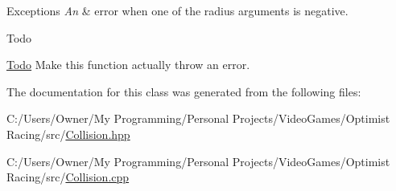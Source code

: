 \begin{DoxyExceptions}{Exceptions}
{\em An} & error when one of the radius arguments is negative. \\
\hline
\end{DoxyExceptions}
\begin{DoxyRefDesc}{Todo}
\item[\hyperlink{todo__todo000002}{Todo}]Make this function actually throw an error. \end{DoxyRefDesc}


The documentation for this class was generated from the following files\-:\begin{DoxyCompactItemize}
\item 
C\-:/\-Users/\-Owner/\-My Programming/\-Personal Projects/\-Video\-Games/\-Optimist Racing/src/\hyperlink{_collision_8hpp}{Collision.\-hpp}\item 
C\-:/\-Users/\-Owner/\-My Programming/\-Personal Projects/\-Video\-Games/\-Optimist Racing/src/\hyperlink{_collision_8cpp}{Collision.\-cpp}\end{DoxyCompactItemize}
